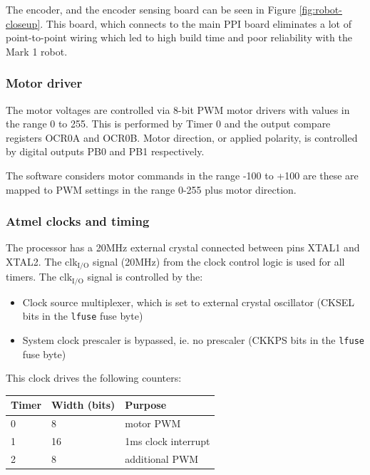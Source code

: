 \documentclass[11pt,fleqn]{article}
\begin{document}
The encoder, and the encoder sensing board can be
seen in Figure \ref{fig:robot-closeup}.  This board, which connects to the main PPI board eliminates a lot of point-to-point wiring which 
 led to high build time and poor reliability with the Mark 1 robot.




\subsubsection{Motor driver}\label{sec:motor-control}
The motor voltages are controlled via 8-bit PWM motor drivers with values in the range 0 to 255.
This is performed by Timer 0 and the output compare registers OCR0A and OCR0B.
Motor direction, or applied polarity, is controlled by digital outputs PB0 and PB1 respectively.

 The software considers motor commands in the range -100 to +100 are these are mapped to PWM settings in the range 0-255 plus motor direction.


\subsubsection{Atmel clocks and timing}
The processor has a 20\unit{MHz} external crystal connected between pins XTAL1 and XTAL2.  
The clk$_{\mbox{I/O}}$ signal (20\unit{MHz}) from the clock control logic is used for all timers.  
The clk$_{\mbox{I/O}}$ signal is controlled
by the:
\begin{itemize}
\item Clock source multiplexer, which is set to external crystal oscillator (CKSEL bits in the \texttt{lfuse} fuse byte)
\item System clock prescaler is bypassed, ie. no prescaler (CKKPS bits in the \texttt{lfuse} fuse byte)
\end{itemize}

This clock drives the following counters:

\begin{table}[h]
\begin{tabular}{|l|l|l|} \hline
Timer & Width (bits) & Purpose \\ \hline
0 & 8 & motor PWM \\
1 & 16 & 1\unit{ms} clock interrupt \\
2 & 8 & additional PWM \\ \hline
\end{tabular} 
\end{table}
\end{document}
